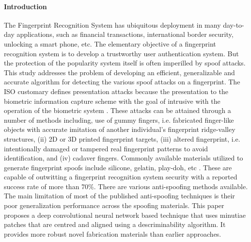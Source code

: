 \paragraph{\textbf{Introduction}}
The Fingerprint Recognition System has ubiquitous deployment in many day-to-day applications, such as financial transactions, international border security, unlocking a smart phone, etc. The elementary objective of a fingerprint recognition system is to develop a trustworthy user authentication system. But the protection of the popularity system itself is often imperilled by spoof attacks. This study addresses the problem of developing an efficient, generalizable and accurate algorithm for detecting the various spoof attacks on a fingerprint. The ISO customary defines presentation attacks because the presentation to the biometric information capture scheme with the goal of intrusive with the operation of the biometric system \cite{1}. These attacks can be attained through a number of methods including, use of gummy fingers, i.e. fabricated finger-like objects with accurate imitation of another individual's fingerprint ridge-valley structures, (ii) 2D or 3D printed fingerprint targets, (iii) altered fingerprint, i.e. intentionally  damaged or tampered real fingerprint patterns to avoid identification, and (iv) cadaver fingers. Commonly available materials utilized to generate fingerprint spoofs include silicone, gelatin,  play-doh, etc \cite{16}. These are capable of outwitting a fingerprint recognition system security with a reported success rate of more than 70\%. There are various anti-spoofing methods available. The main limitation of most of the published anti-spoofing techniques is their poor generalization performance across the spoofing materials. This paper proposes a deep convolutional neural network based technique that uses minutiae patches that are centred and aligned using a descriminability algorithm. It provides more robust novel fabrication materials than earlier approaches.
  
